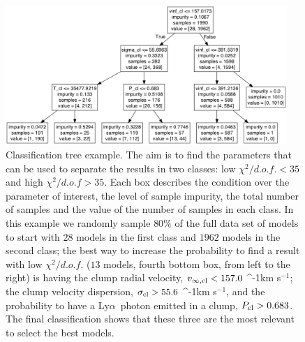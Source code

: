 \documentclass[a4,useAMS,usenatbib,usegraphicx]{mn2e}
\newcommand{\lya}{\ifmmode{{\rm Ly}\alpha}\else Ly$\alpha$\ \fi}
\newcommand{\kms}{\ifmmode\mathrm{km\ s}^{-1}\else km s$^{-1}$\fi}
\begin{document}
\begin{figure}
\begin{center}
\includegraphics[width=0.95\textwidth]{tree_result.pdf}
\caption{Classification tree example. 
The aim is to find the parameters that can be used to separate the
results in two classes: low $\chi^2/d.o.f. < 35$ and high $\chi^2/d.o.f>35$. 
Each box describes the condition over the parameter of interest, the
level of sample impurity, the total number of samples and the value of the
number of samples in each class.  
In this example we randomly sample $80\%$ of the full data set of models to
start with $28$ models in the first class and
$1962$ models in the second class; the best way to increase the
probability to find a result with low $\chi^2/d.o.f.$ ($13$ models,
fourth bottom box, from left to the right)
is having the clump radial velocity, $v_{\infty,{\rm cl}}<157.0$ \kms;
the clump velocity dispersion, $\sigma_{{\rm cl}}>55.6$ \kms, and the
probability to have a \lya photon emitted in a clump, $P_{\rm cl}>0.683$.
The final classification shows that these three are the most relevant
to select the best models.
\label{fig:tree}}
\end{center}
\end{figure}
\end{document}
